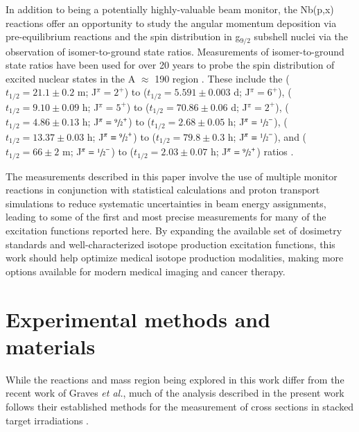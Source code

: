 \documentclass[3p]{elsarticle}
\newcommand{\etal}{\emph{et al.}}
\begin{document}
  
In addition to being a potentially highly-valuable beam monitor, the Nb(p,x) reactions offer an opportunity to study the angular momentum deposition via pre-equilibrium reactions and the spin distribution in g$_{9/2}$ subshell nuclei via the observation of isomer-to-ground state ratios.  
Measurements of isomer-to-ground state ratios have been used for over 20 years to probe the spin distribution of excited nuclear states in the A $\approx$ 190 region \cite{PhysRevC.73.034613,PhysRevC.45.1171}.
These include the  ($t_{1/2}=21.1\pm0.2$ m; J$^\pi=2^+$) to   ($t_{1/2}=5.591\pm0.003$ d; J$^\pi=6^+$),  ($t_{1/2}=9.10\pm0.09$ h; J$^\pi=5^+$) to   ($t_{1/2}=70.86\pm0.06$ d; J$^\pi=2^+$),   ($t_{1/2}=4.86\pm0.13$ h; J$^\pi=\sfrac{9}{2}^+$) to   ($t_{1/2}=2.68\pm0.05$ h; J$^\pi=\sfrac{1}{2}^-$),   ($t_{1/2}=13.37\pm0.03$ h; J$^\pi=\sfrac{9}{2}^+$) to   ($t_{1/2}=79.8\pm0.3$ h; J$^\pi=\sfrac{1}{2}^-$),  and  ($t_{1/2}=66\pm2$ m; J$^\pi=\sfrac{1}{2}^-$) to   ($t_{1/2}=2.03\pm0.07$ h; J$^\pi=\sfrac{9}{2}^+$)  ratios \cite{Dong2015,Nesaraja2010,Singh2014,Johnson2015,Singh2013}.  
 
 
The measurements described in this paper involve the use of multiple monitor reactions in conjunction with statistical calculations and proton transport simulations to reduce systematic uncertainties in beam energy assignments, leading to some of the first and most precise measurements  for many of the excitation functions reported here. 
By expanding the available set of dosimetry standards and well-characterized isotope production excitation functions, this work should help optimize medical isotope production modalities, making more options   available for modern medical imaging and cancer therapy.

 
 
 


\section{Experimental methods and materials}\label{sec:experiment}


While the reactions and mass region being explored in this work differ from the recent work of Graves \etal, much of the analysis described in the present work follows their established methods for the measurement of cross sections in stacked target irradiations   \cite{Graves2016}.
\end{document}
